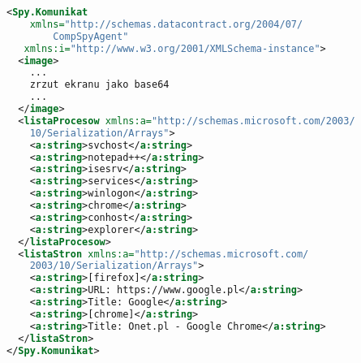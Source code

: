 \begin{lstlisting}[frame=single,captionpos=b,
    caption={Przykładowy komunikat przesyłany do serwera w formacie XML},
    label={lst:kod1},
    language=XML]
<Spy.Komunikat 
    xmlns="http://schemas.datacontract.org/2004/07/
        CompSpyAgent"
   xmlns:i="http://www.w3.org/2001/XMLSchema-instance">
  <image>
    ...
    zrzut ekranu jako base64
    ...
  </image>
  <listaProcesow xmlns:a="http://schemas.microsoft.com/2003/
    10/Serialization/Arrays">
    <a:string>svchost</a:string>
    <a:string>notepad++</a:string>
    <a:string>isesrv</a:string>
    <a:string>services</a:string>
    <a:string>winlogon</a:string>
    <a:string>chrome</a:string>
    <a:string>conhost</a:string>
    <a:string>explorer</a:string>
  </listaProcesow>
  <listaStron xmlns:a="http://schemas.microsoft.com/
    2003/10/Serialization/Arrays">
    <a:string>[firefox]</a:string>
    <a:string>URL: https://www.google.pl</a:string>
    <a:string>Title: Google</a:string>
    <a:string>[chrome]</a:string>
    <a:string>Title: Onet.pl - Google Chrome</a:string>
  </listaStron>
</Spy.Komunikat>
\end{lstlisting}